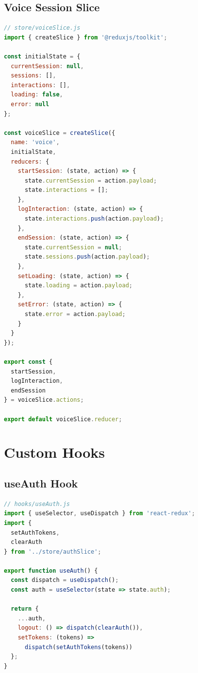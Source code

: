 \documentclass[12pt,a4paper,oneside]{article}
\begin{document}
\subsection{Voice Session Slice}

\begin{lstlisting}[language=javascript]
// store/voiceSlice.js
import { createSlice } from '@reduxjs/toolkit';

const initialState = {
  currentSession: null,
  sessions: [],
  interactions: [],
  loading: false,
  error: null
};

const voiceSlice = createSlice({
  name: 'voice',
  initialState,
  reducers: {
    startSession: (state, action) => {
      state.currentSession = action.payload;
      state.interactions = [];
    },
    logInteraction: (state, action) => {
      state.interactions.push(action.payload);
    },
    endSession: (state, action) => {
      state.currentSession = null;
      state.sessions.push(action.payload);
    },
    setLoading: (state, action) => {
      state.loading = action.payload;
    },
    setError: (state, action) => {
      state.error = action.payload;
    }
  }
});

export const { 
  startSession, 
  logInteraction, 
  endSession 
} = voiceSlice.actions;

export default voiceSlice.reducer;
\end{lstlisting}

\section{Custom Hooks}

\subsection{useAuth Hook}

\begin{lstlisting}[language=javascript]
// hooks/useAuth.js
import { useSelector, useDispatch } from 'react-redux';
import { 
  setAuthTokens, 
  clearAuth 
} from '../store/authSlice';

export function useAuth() {
  const dispatch = useDispatch();
  const auth = useSelector(state => state.auth);

  return {
    ...auth,
    logout: () => dispatch(clearAuth()),
    setTokens: (tokens) => 
      dispatch(setAuthTokens(tokens))
  };
}
\end{lstlisting}
\end{document}
